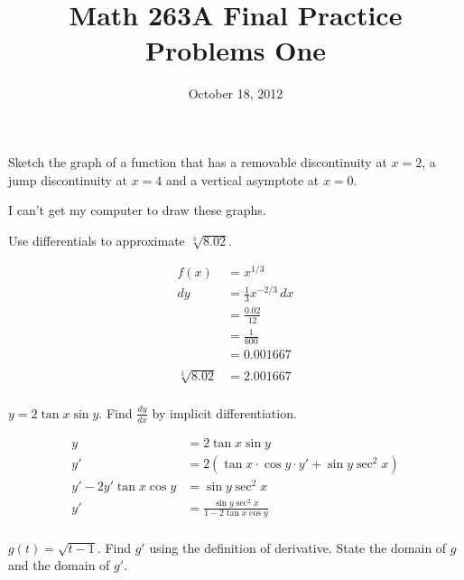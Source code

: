 \documentclass[fleqn,addpoints]{exam}
\title{Math 263A Final Practice Problems One}
\date{October 18, 2012}
\author{}
\begin{document}
\maketitle  

\begin{questions}

\question Sketch the graph of a function that has a removable discontinuity at $x = 2$, a jump
discontinuity at $x = 4$ and a vertical asymptote at $x = 0$.

\begin{solution}
I can't get my computer to draw these graphs.
\end{solution}

\question
Use differentials to approximate $\sqrt[3]{8.02}$.

\begin{solution}
\begin{align*}
  f(x) &= x^{1/3} \\
  dy &= \frac{1}{3} x^{-2/3} \, dx \\
     &= \frac{0.02}{12} \\
     &= \frac{1}{600} \\
     &= 0.001667 \\
\\
  \sqrt[3]{8.02} &= 2.001667 \\
\end{align*}

\end{solution}

\ifprintanswers
\pagebreak
\fi

\question
$y = 2 \tan x \sin y$.  Find $\frac{dy}{dx}$ by implicit differentiation.
\begin{solution}
\begin{align*}
  y &= 2 \tan x \sin y \\
  y' &= 2 ( \tan x \cdot \cos y \cdot y' + \sin y \sec^2 x) \\
  y' - 2 y' \tan x \cos y &= \sin y \sec^2 x \\
  y' &=  \frac{\sin y \sec^2 x}{1 - 2 \tan x \cos y} \\
\end{align*}

\end{solution}

\question
$g(t)= \sqrt{t-1}$.  Find $g'$ using the definition of derivative. State the domain
of $g$ and the domain of $g'$.

\begin{solution}


\end{solution}
\end{questions}
\end{document}
